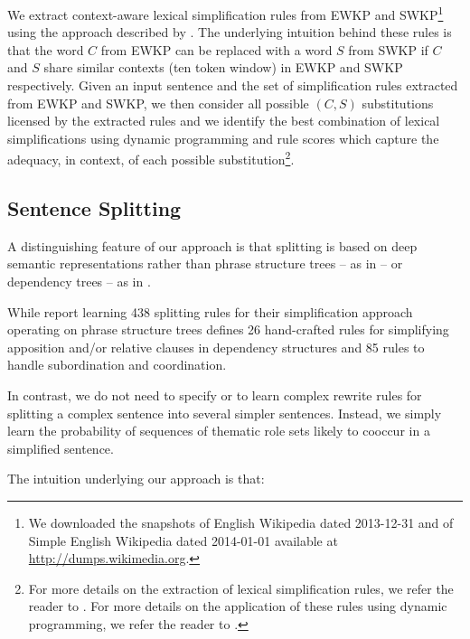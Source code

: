\documentclass[11pt,a4paper]{article}
\begin{document}
We extract context-aware lexical simplification rules from EWKP and
SWKP\footnote{We downloaded the snapshots of English Wikipedia dated
  2013-12-31 and of Simple English Wikipedia dated 2014-01-01
  available at \url{http://dumps.wikimedia.org}.} using the approach
described by . The underlying intuition
behind these rules is that the word $C$ from EWKP can be replaced with
a word $S$ from SWKP if $C$ and $S$ share similar contexts (ten token
window) in EWKP and SWKP respectively. Given an input sentence and the
set of simplification rules extracted from EWKP and SWKP, we then
consider all possible $(C,S)$ substitutions licensed by the extracted
rules and we identify the best combination of lexical simplifications
using dynamic programming and rule scores which capture the adequacy,
in context, of each possible substitution\footnote{For more details on
  the extraction of lexical simplification rules, we refer the reader
  to . For more details on the application
  of these rules using dynamic programming, we refer the reader to
  .}.






\subsection{Sentence Splitting}
\label{subsec:sentencesplitting}

A distinguishing feature of our approach is that splitting is
based on deep semantic representations rather than phrase structure
trees -- as in \cite{zhu2010monolingual,woodsend2011learning} -- or
dependency trees -- as in \cite{siddharthan-mandya:2014:EACL}.  

While  report learning 438 splitting
rules for their simplification approach operating on phrase structure
trees  defines 26 hand-crafted
rules for simplifying apposition and/or relative clauses in dependency
structures and 85 rules to handle subordination and coordination.  

In contrast, we do not need to specify or to learn complex rewrite
rules for splitting a complex sentence into several simpler sentences.
Instead, we simply learn the probability of sequences of thematic role
sets likely to cooccur in a simplified sentence.

The intuition underlying our approach is that:
\end{document}
